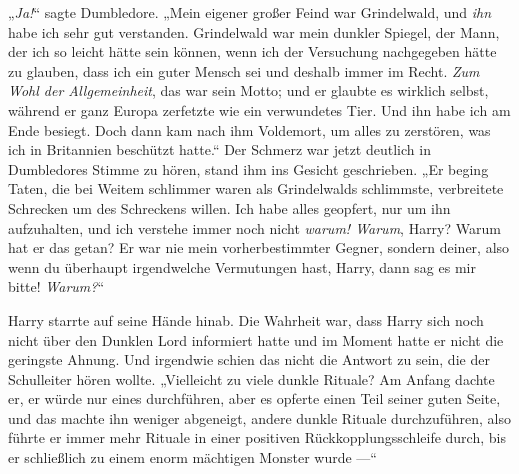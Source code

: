 „\emph{Ja!}“ sagte Dumbledore. „Mein eigener großer Feind war Grindelwald, und \emph{ihn} habe ich sehr gut verstanden. Grindelwald war mein dunkler Spiegel, der Mann, der ich so leicht hätte sein können, wenn ich der Versuchung nachgegeben hätte zu glauben, dass ich ein guter Mensch sei und deshalb immer im Recht. \emph{Zum Wohl der Allgemeinheit}, das war sein Motto; und er glaubte es wirklich selbst, während er ganz Europa zerfetzte wie ein verwundetes Tier. Und ihn habe ich am Ende besiegt. Doch dann kam nach ihm Voldemort, um alles zu zerstören, was ich in Britannien beschützt hatte.“ Der Schmerz war jetzt deutlich in Dumbledores Stimme zu hören, stand ihm ins Gesicht geschrieben. „Er beging Taten, die bei Weitem schlimmer waren als Grindelwalds schlimmste, verbreitete Schrecken um des Schreckens willen. Ich habe alles geopfert, nur um ihn aufzuhalten, und ich verstehe immer noch nicht \emph{warum! Warum}, Harry? Warum hat er das getan? Er war nie mein vorherbestimmter Gegner, sondern deiner, also wenn du überhaupt irgendwelche Vermutungen hast, Harry, dann sag es mir bitte! \emph{Warum?}“

Harry starrte auf seine Hände hinab. Die Wahrheit war, dass Harry sich noch nicht über den Dunklen Lord informiert hatte und im Moment hatte er nicht die geringste Ahnung. Und irgendwie schien das nicht die Antwort zu sein, die der Schulleiter hören wollte.
„Vielleicht zu viele dunkle Rituale? Am Anfang dachte er, er würde nur eines durchführen, aber es opferte einen Teil seiner guten Seite, und das machte ihn weniger abgeneigt, andere dunkle Rituale durchzuführen, also führte er immer mehr Rituale in einer positiven Rückkopplungsschleife durch, bis er schließlich zu einem enorm mächtigen Monster wurde —“

